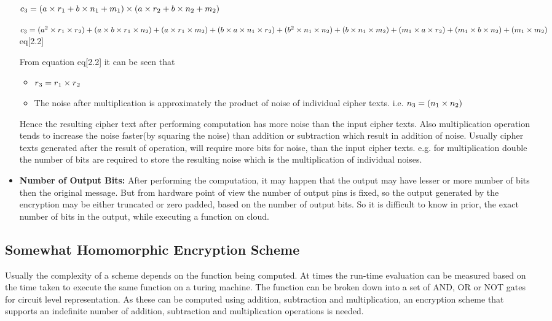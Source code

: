 \begin{itemize}
$c\textsubscript{3}=(a\times r\textsubscript{1}+b\times n\textsubscript{1} +m\textsubscript{1})\times (a\times r\textsubscript{2}+b\times n\textsubscript{2}  +m\textsubscript{2})$

$c\textsubscript{3}=(a^{2}\times r\textsubscript{1}\times r\textsubscript{2})+(a\times b\times r\textsubscript{1}\times n\textsubscript{2})+(a\times r\textsubscript{1}\times m\textsubscript{2})+(b\times a\times n\textsubscript{1}\times r\textsubscript{2})+(b^{2}\times n\textsubscript{1}\times n\textsubscript{2})
+(b\times n\textsubscript{1}\times m\textsubscript{2})+(m\textsubscript{1}\times a\times r\textsubscript{2})+(m\textsubscript{1}\times b\times n\textsubscript{2})+(m\textsubscript{1}\times m\textsubscript{2})$         \hfill                                        eq[2.2]

From equation eq[2.2] it can be seen that
\begin{itemize}
\item
 \noindent $r\textsubscript{3}=r\textsubscript{1}\times r\textsubscript{2}$
\item
The noise after multiplication is approximately the product of noise of individual cipher texts. i.e.
$n\textsubscript{3}=(n\textsubscript{1}\times n\textsubscript{2})$
\end{itemize}
Hence the resulting cipher text after performing computation has more noise than the input cipher texts. Also multiplication operation  tends  to  increase  the noise faster(by squaring the noise) than addition or subtraction which result in addition of noise. Usually cipher texts generated after the result of operation, will require more bits for noise, than the input cipher texts. e.g. for multiplication double the number of bits are required to store the resulting noise which is the multiplication of individual noises.
\item
\textbf{Number of Output Bits:} After performing the computation, it may happen that the output may have lesser or more number of bits then the original message. But from hardware point of view the number of output pins is fixed, so the output generated by the encryption may be either truncated or zero padded, based on the number of output bits. So it is difficult to know in prior, the exact number of bits in the output, while executing a function on cloud.

\end{itemize}

 \subsection{Somewhat Homomorphic Encryption Scheme}
     Usually the complexity of a scheme depends on the function being computed. At times the run-time evaluation can be measured based on the time taken to execute the same function on a turing machine. The function can be broken down into a set of AND, OR or NOT gates for circuit level representation. As these can be computed using addition, subtraction and multiplication, an encryption scheme that supports an indefinite number of addition, subtraction and multiplication operations is needed.
   
